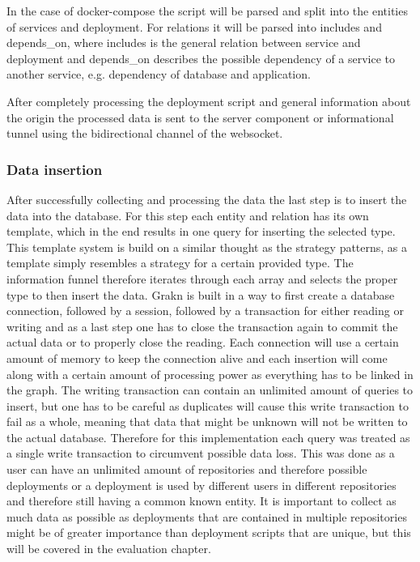 In the case of docker-compose the script will be parsed and split into the entities of services and deployment. For relations it will be parsed into includes and depends\_on, where includes is the general relation between service and deployment and depends\_on describes the possible dependency of a service to another service, e.g. dependency of database and application.

After completely processing the deployment script and general information about the origin the processed data is sent to the server component or informational tunnel using the bidirectional channel of the websocket.

\subsubsection{Data insertion}
After successfully collecting and processing the data the last step is to insert the data into the database. For this step each entity and relation has its own template, which in the end results in one query for inserting the selected type. This template system is build on a similar thought as the strategy patterns, as a template simply resembles a strategy for a certain provided type. The information funnel therefore iterates through each array and selects the proper type to then insert the data.
Grakn is built in a way to first create a database connection, followed by a session, followed by a transaction for either reading or writing and as a last step one has to close the transaction again to commit the actual data or to properly close the reading.
Each connection will use a certain amount of memory to keep the connection alive and each insertion will come along with a certain amount of processing power as everything has to be linked in the graph.
The writing transaction can contain an unlimited amount of queries to insert, but one has to be careful as duplicates will cause this write transaction to fail as a whole, meaning that data that might be unknown will not be written to the actual database. Therefore for this implementation each query was treated as a single write transaction to circumvent possible data loss. This was done as a user can have an unlimited amount of repositories and therefore possible deployments or a deployment is used by different users in different repositories and therefore still having a common known entity. It is important to collect as much data as possible as deployments that are contained in multiple repositories might be of greater importance than deployment scripts that are unique, but this will be covered in the evaluation chapter.

